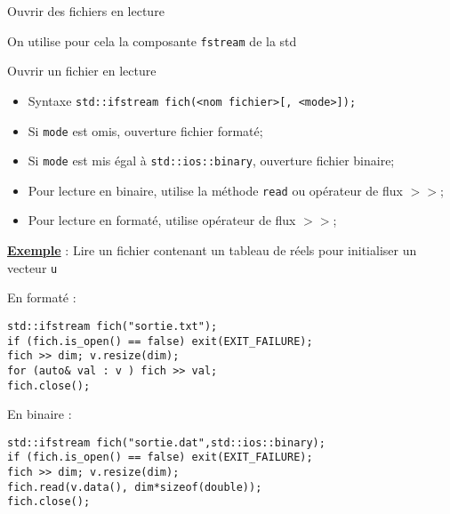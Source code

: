 \documentclass[compress,10pt,aspectratio=169]{beamer}
\begin{document}
\begin{frame}[fragile]{Ouvrir des fichiers en lecture}
  \scriptsize
  
 On utilise pour cela la composante \texttt{fstream} de la std
  
\begin{block}{\small Ouvrir un fichier en lecture}
\begin{itemize}
  \item Syntaxe \texttt{std::ifstream fich(<nom fichier>[, <mode>]);}
  \item Si \texttt{mode} est omis, ouverture fichier formaté;
  \item Si \texttt{mode} est mis égal à \texttt{std::ios::binary}, ouverture fichier binaire;
  \item Pour lecture en binaire, utilise la méthode \texttt{read} ou opérateur de flux $>>$;
  \item Pour lecture en formaté, utilise opérateur de flux $>>$;
\end{itemize}
\end{block}
  
\underline{\textbf{Exemple}} : Lire un fichier contenant un tableau de réels pour initialiser un vecteur \texttt{u}
\begin{multicols}{2}
  En formaté :
\begin{verbatim}
std::ifstream fich("sortie.txt");
if (fich.is_open() == false) exit(EXIT_FAILURE);
fich >> dim; v.resize(dim);
for (auto& val : v ) fich >> val;
fich.close();
\end{verbatim}
\columnbreak
En binaire :
\begin{verbatim}
std::ifstream fich("sortie.dat",std::ios::binary);
if (fich.is_open() == false) exit(EXIT_FAILURE);
fich >> dim; v.resize(dim);
fich.read(v.data(), dim*sizeof(double));
fich.close();
\end{verbatim}
\end{multicols}
\end{frame}
  
\end{document}
